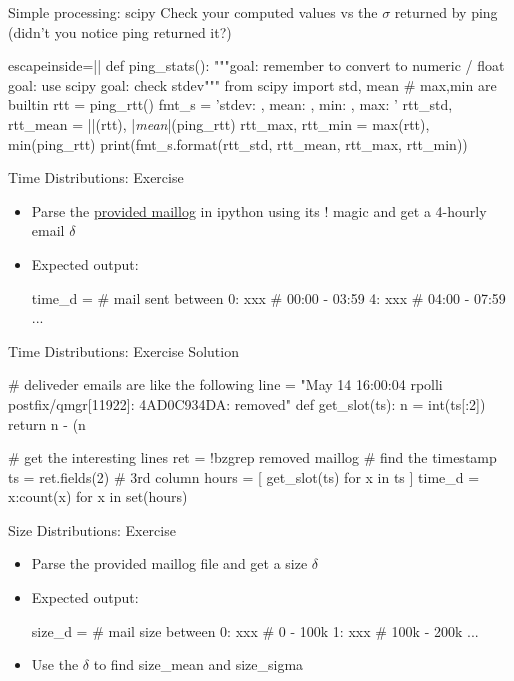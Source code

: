 \begin{frame}[fragile]{Simple processing: scipy}
Check your computed values vs the $\sigma$ returned by ping 
(didn't you notice ping returned it?) 
\begin{pythoncode*}{escapeinside=||}
def ping_stats():
    """goal: remember to convert to numeric / float
       goal: use scipy
       goal: check stdev"""
    from scipy import std, mean # max,min are builtin
    rtt = ping_rtt()
    fmt_s = 'stdev: {}, mean: {}, min: {}, max: {}'
    rtt_std, rtt_mean = ||(rtt), |\emph{mean}|(ping_rtt)
    rtt_max, rtt_min = max(rtt), min(ping_rtt)
    print(fmt_s.format(rtt_std, rtt_mean, rtt_max, rtt_min))
\end{pythoncode*}
\end{frame}

\begin{frame}[fragile]{Time Distributions: Exercise}
\begin{itemize}
\item Parse the \href{https://github.com/ioggstream/python-course/blob/master/python-for-sysadmin/data/maillog}{provided maillog} in ipython using its ! magic and get a 4-hourly email $\delta$
\item Expected output: 
\begin{pythoncode}
time_d = {  # mail sent between
    0: xxx  #  00:00 - 03:59
    4: xxx  #  04:00 - 07:59
    ...
    }
\end{pythoncode}
\end{itemize}
\end{frame}
 
\iftrue
\begin{frame}[fragile]{Time Distributions: Exercise Solution}
\begin{pythoncode}
# deliveder emails are like the following
line = "May 14 16:00:04 rpolli postfix/qmgr[11922]: 4AD0C934DA: removed"
def get_slot(ts):
    n = int(ts[:2])
    return n - (n%
    
# get the interesting lines
ret = !bzgrep removed maillog
# find the timestamp
ts = ret.fields(2) # 3rd column
hours = [ get_slot(ts)  for x in ts ]
time_d = {x:count(x) for x in set(hours)}
\end{pythoncode}
\end{frame}

\fi 

\begin{frame}[fragile]{Size Distributions: Exercise}
\begin{itemize}
\item Parse the provided maillog file and get a size $\delta$
\item Expected output: 
\begin{pythoncode}
size_d = {  # mail size between
    0: xxx  #  0 - 100k
    1: xxx  #  100k - 200k
    ...
    }
\end{pythoncode}
\item Use the $\delta$ to find size\_mean and size\_sigma
\end{itemize}
\end{frame}



